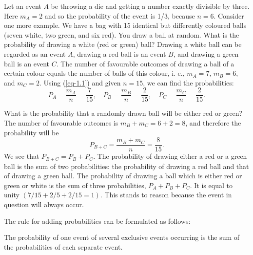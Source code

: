 Let an event $A$ be throwing a die and getting a number exactly
divisible by three. Here $m_{A} = 2$ and so the probability of the
event is 1/3, because $n=6$. Consider one more example. We have a
bag with 15 identical but differently coloured balls (seven white, two green, and six
red). You draw a ball at random. What is the probability of drawing
a white (red or green) ball? Drawing a white ball can be regarded as an
event $A$, drawing a red ball is an event $B$, and drawing a green ball is an event $C$. The number of favourable outcomes of drawing a ball of
a certain colour equals the number of balls of this colour, i. e., $m_{A} = 7$, $m_{B} = 6$, and $m_{C} = 2$. Using (\ref{eq-1.1}) and given $n = 15$, we can find the
probabilities:
\begin{equation*}
P_{A} = \dfrac{m_{A}}{n} = \dfrac{7}{15}, \quad P_{B} =
\dfrac{m_{B}}{n} = \dfrac{2}{15}, \quad P_{C} = \dfrac{m_{C}}{n} = \dfrac{2}{15}. 
\end{equation*}

 What is the probability that a randomly drawn ball will be either red or green? The number of favourable outcomes is $m_{B} + m_{C} = 6 + 2 = 8$, and therefore the probability will be
\begin{equation*}%
P_{B+C} = \frac{m_{B}+m_{C}}{n} = \frac{8}{15}.
\end{equation*} 
We see that $ P_{B+C} = P_{B} + P_{C} $. The probability of drawing either a red or a green ball is the sum of two probabilities: the probability of drawing a red ball and that of drawing a green ball. The probability of drawing a ball which is either red or green or white is the sum of three probabilities, $P_{A} + P_{B} + P_{C}$. It is equal to unity $(7/15 + 2/5 + 2/15 = 1)$. This stands to reason because the event in question will always occur.

The rule for adding probabilities can be formulated as follows: 
\begin{mybox}{}
The probability of one event of several exclusive events occurring is the sum of the probabilities of each separate event.
\end{mybox}


